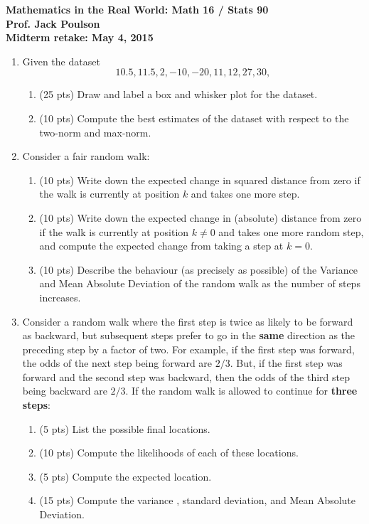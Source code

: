 \documentclass[11pt]{article}
\begin{document}
\noindent
{\bf Mathematics in the Real World: Math 16 / Stats 90}\\
{\bf Prof. Jack Poulson}\\
{\bf Midterm retake: May 4, 2015}\\

\begin{enumerate}

\item
  Given the dataset 
  \[
    10.5, 11.5, 2, -10, -20, 11, 12, 27, 30,
  \]
  \begin{enumerate}
  \item
   (25 pts) Draw and label a box and whisker plot for the dataset.
  \item 
   (10 pts) Compute the best estimates of the dataset with respect to the 
            two-norm and max-norm.
  \end{enumerate}

\item 
  Consider a fair random walk:
  \begin{enumerate}
  \item
    (10 pts) Write down the expected change in squared distance from zero
             if the walk is currently at position $k$ and takes one more
             step.
  \item
    (10 pts) Write down the expected change in (absolute) distance from zero
             if the walk is currently at position $k \neq 0$ and takes one more
             random step, and compute the expected change from taking a step
             at $k = 0$.
  \item
    (10 pts) Describe the behaviour (as precisely as possible) of the Variance
             and Mean Absolute Deviation of the random walk as the number of 
             steps increases.
  \end{enumerate}

\item
  Consider a random walk where the first step is twice as likely to be forward
  as backward, but subsequent steps prefer to go in the {\bf same} direction as 
  the preceding step by a factor of two.
  For example, if the first step was forward, the odds of the next step being
  forward are $2/3$. But, if the first step was forward and the second step 
  was backward, then the odds of the third step being backward are $2/3$.
  If the random walk is allowed to continue for {\bf three steps}:
  \begin{enumerate}
  \item (5 pts) List the possible final locations.
  \item (10 pts) Compute the likelihoods of each of these locations.
  \item (5 pts) Compute the expected location.
  \item (15 pts) Compute the variance , standard deviation, and 
                 Mean Absolute Deviation.
  \end{enumerate}
\end{enumerate}
\end{document}

